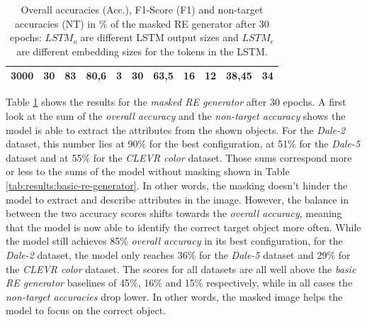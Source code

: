 \begin{table}[ht]
\begin{tabular}{cc|ccc|ccc|ccc}
        {3000}   & {30}     & {83}                                & {80,6}                              & {3}                                      & {30}          & {63,5}         & {16}        & {12}          & {38,45}        & {34}        \\
        \bottomrule
    \end{tabular}
    \caption{Overall accuracies (Acc.), F1-Score (F1) and non-target accuracies (NT) in \% of the masked RE generator after 30 epochs: $LSTM_o$ are different LSTM output sizes and $LSTM_e$ are different embedding sizes for the tokens in the LSTM.}
    \label{tab:results:masked-re-generator}
\end{table}

Table \ref{tab:results:masked-re-generator} shows the results for the \emph{masked RE generator} after 30 epochs.
A first look at the sum of the \emph{overall accuracy} and the \emph{non-target accuracy} shows the model is able to extract the attributes from the shown objects.
For the \emph{Dale-2} dataset, this number lies at 90\% for the best configuration, at 51\% for the \emph{Dale-5} dataset and at 55\% for the \emph{CLEVR color} dataset.
Those sums correspond more or less to the sums of the model without masking shown in Table \ref{tab:results:basic-re-generator}.
In other words, the masking doesn't hinder the model to extract and describe attributes in the image.
However, the balance in between the two accuracy scores shifts towards the \emph{overall accuracy}, meaning that the model is now able to identify the correct target object more often.
While the model still achieves 85\% \emph{overall accuracy} in its best configuration, for the \emph{Dale-2} dataset, the model only reaches 36\% for the \emph{Dale-5} dataset and 29\% for the \emph{CLEVR color} dataset.
The scores for all datasets are all well above the \emph{basic RE generator} baselines of 45\%, 16\% and 15\% respectively, while in all cases the \emph{non-target accuracies} drop lower.
In other words, the masked image helps the model to focus on the correct object.

